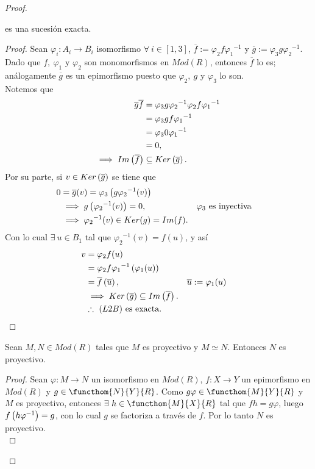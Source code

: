 \documentclass{article}
\begin{document}
\begin{enumerate}[label=\textbf{Ej \arabic*.}]
\begin{proof}
\begin{lem}
				es una sucesión exacta.
			\end{lem}
			\begin{proof}
				Sean $\varphi_i:A_i\to B_i$ isomorfismo $\forall\ i\in[1,3]$, $\overline{f}:=\varphi_2f{\varphi_1}^{-1}$ y $\overline{g}:=\varphi_3
				g{\varphi_2}^{-1}$. Dado que $f,\ \varphi_1$ y $\varphi_2$ son monomorfismos en $Mod(R)$, entonces $\overline{f}$ lo es; análogamente $\overline{g}$ es un epimorfismo puesto que $\varphi_2,\ g$ y $\varphi_3$ lo son. \\
				Notemos que
				\begin{align*}
					\overline{g}\overline{f}&=\varphi_3
					g{\varphi_2}^{-1}\varphi_2 f{\varphi_1}^{-1}\\
					&=\varphi_3
					gf{\varphi_1}^{-1}\\
					&=\varphi_3 0 {\varphi_1}^{-1}\\
					&=0,\\
					\implies Im\left(\overline{f}\right)&\subseteq Ker\left(\overline{g}\right).
				\end{align*}
				Por su parte, si $v\in Ker\left(\overline{g}\right)$ se tiene que
				\begin{align*}
					0&=\overline{g}(v)=\varphi_3
					\left(g{\varphi_2}^{-1}(v)\right)\\
					&\implies g\left({\varphi_2}^{-1}(v)\right)=0, && \varphi_3\text{ es inyectiva}\\
					&\implies{\varphi_2}^{-1}(v)\in Ker(g)=Im(f).
				\end{align*}
				Con lo cual $\exists\ u\in B_1$ tal que ${\varphi_2}^{-1}(v)=f(u)$, y así \begin{align*}
					v&=\varphi_2 f(u)\\
					 &=\varphi_2 f{\varphi_1}^{-1}\left(\varphi_1(u)\right)\\
					 &=\overline{f}\left(\overline{u}\right), && \overline{u}:=\varphi_1(u)\\
					 &\implies Ker\left(\overline{g}\right)\subseteq Im\left(\overline{f}\right).\\
					 &\therefore\ (L2B)\text{ es exacta.}
				\end{align*}
			\end{proof}
			\begin{lem}
				Sean $M,N\in Mod(R)$ tales que $M$ es proyectivo y $M\simeq N$. Entonces $N$ es proyectivo.
			\end{lem}
			\begin{proof}
				Sean $\varphi:M\to N$ un isomorfismo en $Mod(R)$, $f:X\to Y$ un epimorfismo en $Mod(R)$ y $g\in\functhom{N}{Y}{R}$. Como $g\varphi \in\functhom{M}{Y}{R}$ y $M$ es proyectivo, entonces $\exists\ h\in\functhom{M}{X}{R}$ tal que $fh=g\varphi$, luego $f\left(h\varphi^{-1}\right)=g$, con lo cual $g$ se factoriza a través de $f$. Por lo tanto $N$ es proyectivo.\\

\end{proof}
\end{proof}
\end{enumerate}
\end{document}

